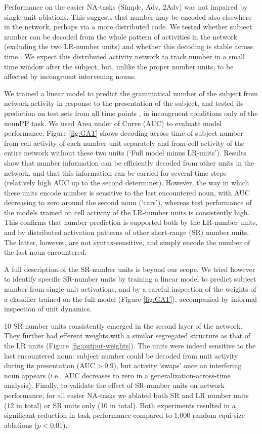 Performance on the easier NA-tasks (Simple, Adv, 2Adv) was not
impaired by single-unit ablations. This suggests that number may be
encoded also elsewhere in the network, perhaps via a more distributed
code. We tested whether subject number can be decoded from the whole
pattern of activities in the network (excluding the two LR-number units)
and whether this decoding is stable across time \cite[see][for similar
observations and related methods]{Giulianelli:etal:2018}. We expect
this distributed activity network to track number in a
small time window after the subject, but, unlike the proper number units,
to be affected by incongruent intervening nouns.

We trained a linear model to predict the grammatical number of the
subject from network activity in response to the presentation of the
subject, and tested its prediction on test sets from all time points
\cite{King:Dehaene:2014}, in incongruent conditions only of the nounPP
task. We used Area under of Curve (AUC) to evaluate model
performance. Figure \ref{fig:GAT} shows decoding across time of
subject number from cell activity of each number unit separately and
from cell activity of the entire network without these two units
(`Full model minus LR-units'). Results show that number information
can be efficiently decoded from other units in the network, and that
this information can be carried for several time steps (relatively
high AUC up to the second determiner). However, the way in which these
units encode number is sensitive to the last encountered noun, with
AUC decreasing to zero around the second noun (`cars'), whereas test
performance of the models trained on cell activity of the LR-number
units is consistently high. This confirms that number prediction is
supported both by the LR-number units, and by distributed activation
patterns of other short-range (SR) number units. The latter, however,
are not syntax-sensitive, and simply encode the number of the last
noun encountered.

A full description of the SR-number units is beyond our scope. We
tried however to identify specific SR-number units by training a
linear model to predict subject number from single-unit activations,
and by a careful inspection of the weights of a classifier trained on
the full model (Figure \ref{fig:GAT}), accompanied by informal
inspection of unit dynamics.

10 SR-number units consistently emerged in the second layer of the
network. They further had efferent weights with a similar segregated
structure as that of the LR units (Figure
\ref{fig:output-weights}). The units were indeed sensitive to the last
encountered noun: subject number could be decoded from unit activity
during its presentation (AUC$>0.9$), but activity `swaps' once an
interfering noun appears (i.e., AUC decreases to zero in a
generalization-across-time analysis).
Finally, to validate the effect of SR-number units on network
performance, for all easier NA-tasks we ablated both SR and LR number
units (12 in total) or SR units only (10 in total). Both experiments
resulted in a significant reduction in task performance compared to
1,000 random equi-size ablations ($p<0.01$).

